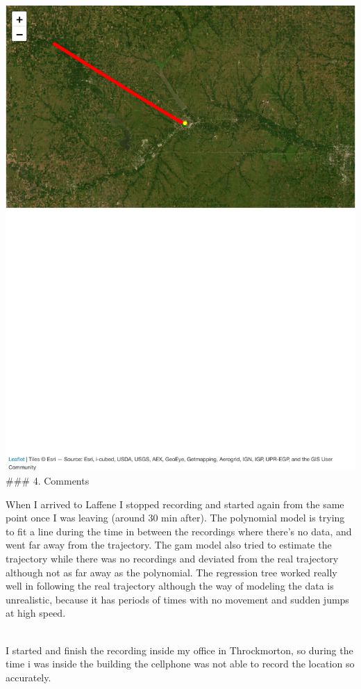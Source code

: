 \documentclass[
]{book}
\begin{document}
\includegraphics{_main_files/figure-latex/unnamed-chunk-10-1.pdf}
\#\#\# 4. Comments

When I arrived to Laffene I stopped recording and started again from the same point once I was leaving (around 30 min after). The polynomial model is trying to fit a line during the time in between the recordings where there's no data, and went far away from the trajectory. The gam model also tried to estimate the trajectory while there was no recordings and deviated from the real trajectory although not as far away as the polynomial. The regression tree worked really well in following the real trajectory although the way of modeling the data is unrealistic, because it has periods of times with no movement and sudden jumps at high speed.\\
\strut \\
I started and finish the recording inside my office in Throckmorton, so during the time i was inside the building the cellphone was not able to record the location so accurately.
\end{document}
